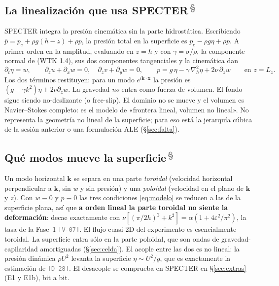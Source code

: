 \documentclass[11pt,a4paper]{article}
\newcommand{\etq}[1]{\textcolor{gray}{\texttt{[#1]}}}
\newcommand{\propio}{\textsuperscript{\textcolor{gray}{\,\S}}}
\begin{document}
\subsection{La linealización que usa SPECTER\propio}

SPECTER integra la presión cinemática sin la parte hidrostática. Escribiendo
$\bar p=p_e+\rho g(h-z)+\rho p$, la presión total en la superficie es
$p_e-\rho g\eta+\rho p$. A primer orden en la amplitud, evaluando en $z=h$ y con
$\gamma=\sigma/\rho$, la componente normal de (WTK 1.4), sus dos componentes tangenciales
y la cinemática dan
\begin{equation}
\partial_t\eta=w,\qquad
\partial_zu+\partial_xw=0,\quad \partial_zv+\partial_yw=0,\qquad
p=g\,\eta-\gamma\,\nabla_h^2\eta+2\nu\,\partial_zw
\qquad\text{en } z=L_z .
\label{eq:modelo}
\end{equation}
Los dos términos restituyen: para un modo $e^{i\mathbf k\cdot\mathbf x}$ la presión es
$(g+\gamma k^2)\eta+2\nu\partial_zw$. La gravedad \emph{no} entra como fuerza de volumen.
El fondo sigue siendo no-deslizante (o free-slip). El dominio no se mueve y el volumen es
Navier--Stokes completo: es el modelo de «frontera lineal, volumen no lineal». No
representa la geometría no lineal de la superficie; para eso está la jerarquía cúbica de
la sesión anterior o una formulación ALE (§\ref{sec:falta}).

\subsection{Qué modos mueve la superficie\propio}
\label{sec:toroidal}

Un modo horizontal $\mathbf k$ se separa en una parte \emph{toroidal} (velocidad horizontal
perpendicular a $\mathbf k$, sin $w$ y sin presión) y una \emph{poloidal} (velocidad en el
plano de $\mathbf k$ y $z$). Con $w\equiv0$ y $p\equiv0$ las tres condiciones
\eqref{eq:modelo} se reducen a las de la superficie plana, así que \textbf{a orden lineal la
parte toroidal no siente la deformación}: decae exactamente con
$\nu[(\pi/2h)^2+k^2]=\alpha(1+4\varepsilon^2/\pi^2)$, la tasa de la Fase~1 \etq{V-07}. El
flujo cuasi-2D del experimento es esencialmente toroidal. La superficie entra sólo en la
parte poloidal, que son ondas de gravedad-capilaridad amortiguadas (§\ref{sec:celda}). El
acople entre las dos es no lineal: la presión dinámica $\rho U^2$ levanta la superficie
$\eta\sim U^2/g$, que es exactamente la estimación de \etq{D-28}. El desacople se comprueba en
SPECTER en §\ref{sec:extras} (E1 y E1b), bit a bit.
\end{document}
